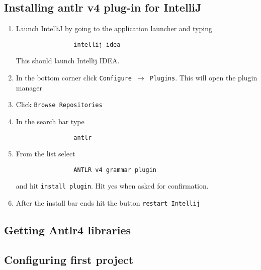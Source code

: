 \documentclass{article}
\begin{document}
	\subsection{Installing antlr v4 plug-in for IntelliJ}

		\begin{enumerate}
			\item Launch IntelliJ by going to the application launcher and typing
			\begin{lstlisting}
				intellij idea
			\end{lstlisting}
			This should launch Intellij IDEA.

			\item In the bottom corner click \texttt{Configure $\rightarrow$ Plugins}. This will open the plugin manager
			\item Click \texttt{Browse Repositories}
			\item In the search bar type
			\begin{lstlisting}
				antlr
			\end{lstlisting}
			\item From the list select
			\begin{lstlisting}
				ANTLR v4 grammar plugin
			\end{lstlisting}
			and hit \texttt{install plugin}. Hit yes when asked for confirmation.
			\item After the install bar ends hit the button \texttt{restart Intellij}
		\end{enumerate}


	\subsection{Getting Antlr4 libraries}



	\subsection{Configuring first project}
\end{document}
